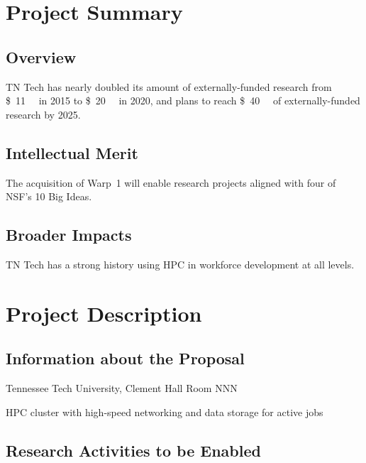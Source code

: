 \documentclass[10pt]{nsf-proposal}
\newcommand{\dol}[2][]{\SI{#2}[\$]{#1}}
\begin{document}
\chapter*{Project Summary} %

\section*{Overview}

TN Tech has nearly doubled its amount of externally-funded research from \dol[\mega\relax]{11} in 2015 to \dol[\mega\relax]{20} in 2020, and plans to reach \dol[\mega\relax]{40} of externally-funded research by 2025.

\section*{Intellectual Merit}

The acquisition of Warp~1 will enable research projects aligned with four of NSF's 10 Big Ideas.

\section*{Broader Impacts}

TN Tech has a strong history using HPC in workforce development at all levels.

\chapter{Project Description}

\section{Information about the Proposal}

\begin{description}[labelwidth=1.7in,leftmargin=\labelwidth,labelsep=0pt]
\item[Instrument Location:] Tennessee Tech University, Clement Hall Room NNN
\item[Instrument Type:] HPC cluster with high-speed networking and data storage for active jobs
\end{description}

\section{Research Activities to be Enabled}
\end{document}
